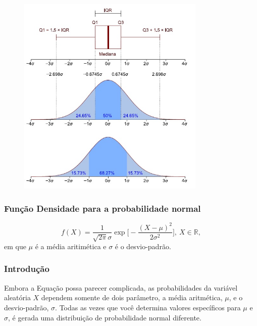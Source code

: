 \documentclass[14pt,aspectratio=1610]{beamer}
\begin{document}
\begin{frame}{}
\frametitle{}
\begin{figure}[H]
    \centering
    \includegraphics[height=0.6\textwidth, width=0.8\textwidth]{Amplitude_interquartil}
  \end{figure}
\end{frame}

\begin{frame}{}
\frametitle{Função Densidade para a probabilidade normal}
\begin{block}{}
\justifying
\begin{equation}
f(X)=\dfrac{1}{\sqrt{2\pi}\sigma}\exp{\Biggl[-\dfrac{(X-\mu)^{2}}{2\sigma^{2}}\Biggl]},\ X\in  \mathds{R},
\end{equation}
em que $\mu$ é a média aritimética e $\sigma$ é o desvio-padrão.
\end{block}
\end{frame}

\begin{frame}{}
\frametitle{Introdução}
\begin{block}{}
\justifying
Embora a Equação possa parecer complicada, as probabilidades da variável aleatória $X$ dependem somente de dois parâmetro, a média aritmética, $\mu$, e o desvio-padrão, $\sigma$. Todas as vezes que você determina valores específicos para $\mu$ e $\sigma$, é gerada uma distribuição de probabilidade normal diferente.
\end{block}
\end{frame}
\end{document}
